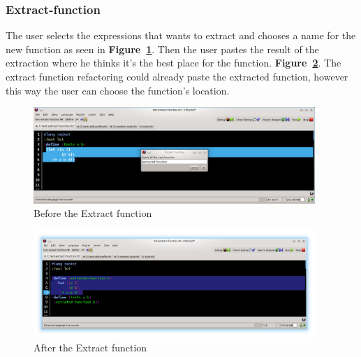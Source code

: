\subsubsection{Extract-function}
The user selects the expressions that wants to extract and chooses a name for the new function as seen in {\bf Figure~\ref{fig:extractBefore}}.
Then the user pastes the result of the extraction where he thinks it's the best place for the function. {\bf Figure~\ref{fig:extractAfter}}.
The extract function refactoring could already paste the extracted function, however this way the user can choose the function's location.
\begin{figure}[htbp]
	\centering
	\includegraphics[width=0.95\textwidth]{img/extract1.png}
	\caption{Before the Extract function}
	\label{fig:extractBefore}
\end{figure}

\begin{figure}[htbp]
	\centering
	\includegraphics[width=0.95\textwidth]{img/extract2.png}
	\caption{After the Extract function}
	\label{fig:extractAfter}
\end{figure}

